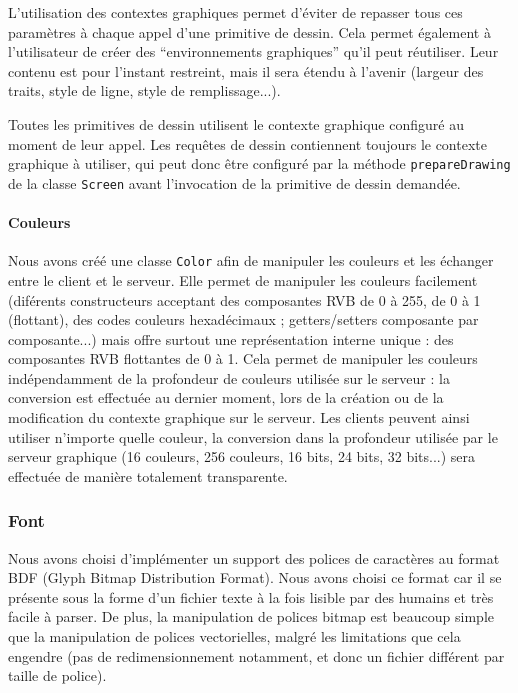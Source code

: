 L'utilisation des contextes graphiques permet d'éviter de repasser tous ces paramètres à chaque appel d'une primitive de dessin. Cela permet également à l'utilisateur de créer des ``environnements graphiques'' qu'il peut réutiliser. Leur contenu est pour l'instant restreint, mais il sera étendu à l'avenir (largeur des traits, style de ligne, style de remplissage...).

Toutes les primitives de dessin utilisent le contexte graphique configuré au moment de leur appel. Les requêtes de dessin contiennent toujours le contexte graphique à utiliser, qui peut donc être configuré par la méthode \verb|prepareDrawing| de la classe \verb|Screen| avant l'invocation de la primitive de dessin demandée.

\paragraph{Couleurs}
Nous avons créé une classe \verb|Color| afin de manipuler les couleurs et les échanger entre le client et le serveur. Elle permet de manipuler les couleurs facilement (diférents constructeurs acceptant des composantes RVB de 0 à 255, de 0 à 1 (flottant), des codes couleurs hexadécimaux ; getters/setters composante par composante...) mais offre surtout une représentation interne unique : des composantes RVB flottantes de 0 à 1. Cela permet de manipuler les couleurs indépendamment de la profondeur de couleurs utilisée sur le serveur : la conversion est effectuée au dernier moment, lors de la création ou de la modification du contexte graphique sur le serveur. Les clients peuvent ainsi utiliser n'importe quelle couleur, la conversion dans la profondeur utilisée par le serveur graphique (16 couleurs, 256 couleurs, 16 bits, 24 bits, 32 bits...) sera effectuée de manière totalement transparente.

\subsubsection{Font}
Nous avons choisi d'implémenter un support des polices de caractères au format BDF (Glyph Bitmap Distribution Format). Nous avons choisi ce format car il se présente sous la forme d'un fichier texte à la fois lisible par des humains et très facile à parser. De plus, la manipulation de polices bitmap est beaucoup simple que la manipulation de polices vectorielles, malgré les limitations que cela engendre (pas de redimensionnement notamment, et donc un fichier différent par taille de police).

